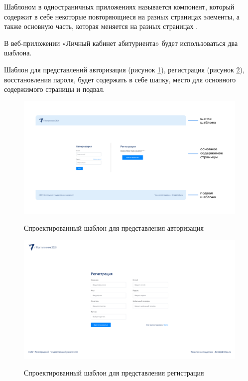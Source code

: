 Шаблоном в одностраничных приложениях называется компонент, который содержит в себе некоторые повторяющиеся на разных страницах элементы, а также основную часть, которая меняется на разных страницах \cite{designinfsystems}.

В веб-приложении «Личный кабинет абитуриента» будет использоваться два шаблона.

Шаблон для представлений авторизация (рисунок \ref{fig:templateauth}), регистрация (рисунок \ref{fig:templatereg}), восстановления пароля, будет содержать в себе шапку, место для основного содержимого страницы и подвал.

\begin{figure}[H]
\begin{center}
\includegraphics[width=1\hsize]{fig/template.png}\\[2mm]
\caption{Спроектированный шаблон для представления авторизация}\label{fig:templateauth}
\end{center}
\end{figure}


\begin{figure}[H]
\begin{center}
\includegraphics[width=1\hsize]{fig/template-reg.png}\\[2mm]
\caption{Спроектированный шаблон для представления регистрация}\label{fig:templatereg}
\end{center}
\end{figure}

